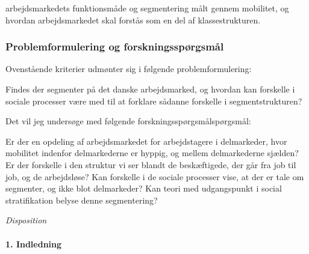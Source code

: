 


arbejdsmarkedets funktionsmåde og segmentering målt gennem mobilitet, og hvordan arbejdsmarkedet skal forstås som en del af klassestrukturen. 

\subsubsection{Problemformulering og forskningsspørgsmål}
%
Ovenstående kriterier udmønter sig i følgende problemformulering:
%
\vspace{\baselineskip}
%
\begin{tcolorbox}[title=\textbf{Problemformulering}]
Findes der segmenter på det danske arbejdsmarked, og hvordan kan forskelle i sociale processer være med til at forklare sådanne forskelle i segmentstrukturen?
\end{tcolorbox}
%
\vspace{\baselineskip}
Det vil jeg undersøge med følgende forskningsspørgsmålspørgsmål:
\vspace{\baselineskip}
\begin{tcolorbox}[title=Forskningspørgsmål,
subtitle style={boxrule=0.4pt} ]
Er der en opdeling af arbejdsmarkedet for arbejdstagere i delmarkeder, hvor mobilitet indenfor delmarkederne er hyppig, og mellem delmarkederne sjælden?
Er der forskelle i den struktur vi ser blandt de beskæftigede, der går fra job til job, og de arbejdsløse?
Kan forskelle i de sociale processer vise, at der er tale om segmenter, og ikke blot delmarkeder?
Kan teori med udgangspunkt i social stratifikation belyse denne segmentering?
\end{tcolorbox}


\emph{Disposition}


\paragraph{1. Indledning}

